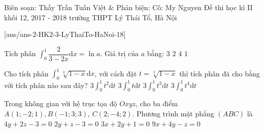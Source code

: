 
\begin{name}
{Biên soạn: Thầy Trần Tuấn Việt \& Phản biện: Cô: My Nguyen }
{Đề thi học kì II khối 12, 2017 - 2018 trường THPT Lý Thái Tổ, Hà Nội}
\end{name}
\setcounter{ex}{0}\setcounter{bt}{0}
[ans/ans-2-HK2-3-LyThaiTo-HaNoi-18]




\begin{ex} %
Tích phân $\displaystyle \int_0^1\dfrac{2}{3 - 2x}\mathrm{d}x = \ln a$. Giá trị của $a$ bằng:
\choice
{\True $3$}
{$2$}
{$4$}
{$1$}
\end{ex}

\begin{ex}%
Cho tích phân $\displaystyle \int_0^1\sqrt[3]{1 - x} \mathrm{d}x$, với cách đặt $t = \sqrt[3]{1 - x}$ thì tích phân đã cho bằng với tích phân nào sau đây?
\choice
{$3\displaystyle \int_0^1 t^2 \mathrm{d}t$}
{$3\displaystyle\int_0^1 t \mathrm{d}t$}
{\True $3\displaystyle\int_0^1 t^3 \mathrm{d}t$}
{$3\displaystyle \int_0^1t^4 \mathrm{d}t $}
\end{ex}




\begin{ex}%
Trong không gian với hệ trục tọa độ $Oxyz$, cho ba điểm $A(1; -2; 1), B(-1; 3; 3)$, $C(2; -4; 2)$. Phương trình mặt phẳng $(ABC)$ là  
\choice
{$4y + 2z -3 = 0$}
{$2y + z - 3 = 0$}
{$3x + 2y + 1 = 0$}
{\True $9x + 4y - z = 0$}
\end{ex}




